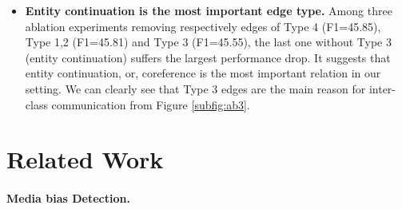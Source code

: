 \documentclass[letterpaper]{article} %
\begin{document}
\begin{itemize}
    
    \item \textbf{Entity continuation is the most important edge type.} Among three ablation experiments removing respectively edges of Type 4 (F1=45.85), Type 1,2 (F1=45.81) and Type 3 (F1=45.55), the last one without Type 3 (entity continuation) suffers the largest performance drop. It suggests that entity continuation, or, coreference is the most important relation in our setting.
    We can clearly see that Type 3 edges are the main reason for inter-class communication from Figure \ref{subfig:ab3}.

\end{itemize}



\section{Related Work}

\paragraph{Media bias Detection.} 

\end{document}
